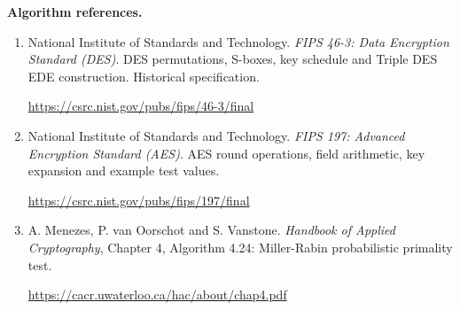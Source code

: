 \documentclass[11pt,a4paper]{article}
\begin{document}
\textbf{Algorithm references.}
\begin{enumerate}
\setlength{\itemsep}{7pt}
\item National Institute of Standards and Technology. \emph{FIPS 46-3: Data Encryption Standard (DES)}. DES permutations, S-boxes, key schedule and Triple DES EDE construction. Historical specification.\par
\url{https://csrc.nist.gov/pubs/fips/46-3/final}
\item National Institute of Standards and Technology. \emph{FIPS 197: Advanced Encryption Standard (AES)}. AES round operations, field arithmetic, key expansion and example test values.\par
\url{https://csrc.nist.gov/pubs/fips/197/final}
\item A. Menezes, P. van Oorschot and S. Vanstone. \emph{Handbook of Applied Cryptography}, Chapter 4, Algorithm 4.24: Miller-Rabin probabilistic primality test.\par
\url{https://cacr.uwaterloo.ca/hac/about/chap4.pdf}
\end{enumerate}
\end{document}
